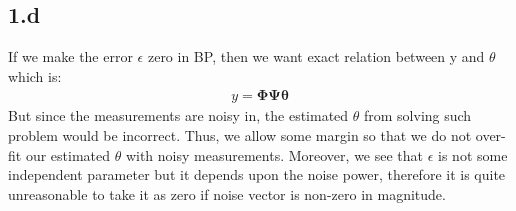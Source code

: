 \documentclass[12pt]{article}
\begin{document}
\subsection*{1.d}
If we make the error $\epsilon$ zero in BP, then we want exact relation between y and $\theta$ which is:
\begin{align*}
    y = \boldsymbol{\Phi\Psi\theta}
\end{align*}
But since the measurements are noisy in, the estimated $\theta$ from solving such problem would be incorrect. Thus, we allow some margin so that we do not over-fit our estimated $\theta$ with noisy measurements. Moreover, we see that $\epsilon$ is not some independent parameter but it depends upon the noise power, therefore it is quite unreasonable to take it as zero if noise vector is non-zero in magnitude.
\end{document}
